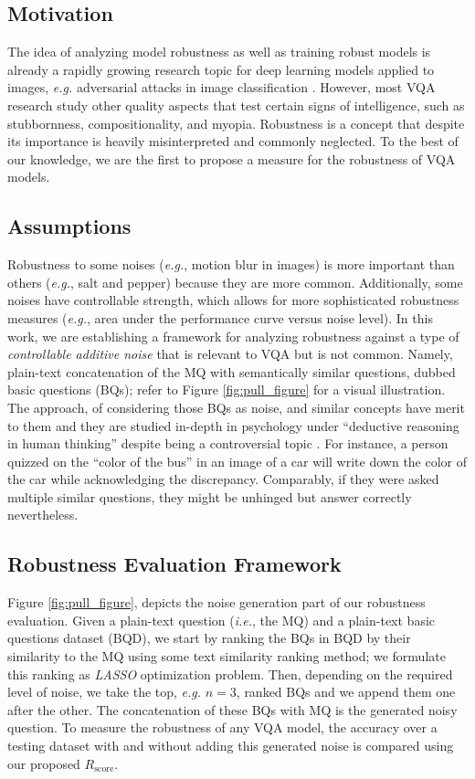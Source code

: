 \documentclass[letterpaper]{article}
\newcommand{\ie}{}\def\ie/{{\em i.e.}}
\newcommand{\eg}{}\def\eg/{{\em e.g.}}
\newcommand{\lasso}{}\def\lasso/{\textit{LASSO}}
\newcommand{\rscore}{}\def\rscore/{$R_{\text{score}}$}
\begin{document}
\subsection{Motivation}
The idea of analyzing model robustness as well as training robust models is already a rapidly growing research topic for deep learning models applied to images, \eg/ adversarial attacks in image classification \cite{61,63}. However, most VQA research study other quality aspects that test certain signs of intelligence, such as stubbornness, compositionality, and myopia. Robustness is a concept that despite its importance is heavily misinterpreted and commonly neglected. To the best of our knowledge, we are the first to propose a measure for the robustness of VQA models.

\subsection{Assumptions}
Robustness to some noises (\eg/, motion blur in images) is more important than others (\eg/, salt and pepper) because they are more common. Additionally, some noises have controllable strength, which allows for more sophisticated robustness measures (\eg/, area under the performance curve versus noise level). In this work, we are establishing a framework for analyzing robustness against a type of \emph{controllable additive noise} that is relevant to VQA but is not common. Namely, plain-text concatenation of the MQ with semantically similar questions, dubbed basic questions (BQs); refer to Figure \ref{fig:pull_figure} for a visual illustration. The approach, of considering those BQs as noise, and similar concepts have merit to them and they are studied in-depth in psychology under ``deductive reasoning in human thinking'' despite being a controversial topic \cite{74}. For instance, a person quizzed on the ``color of the bus'' in an image of a car will write down the color of the car while acknowledging the discrepancy. Comparably, if they were asked multiple similar questions, they might be unhinged but answer correctly nevertheless.

\subsection{Robustness Evaluation Framework}
Figure \ref{fig:pull_figure}, depicts the noise generation part of our robustness evaluation. Given a plain-text question (\ie/, the MQ) and a plain-text basic questions dataset (BQD), we start by ranking the BQs in BQD by their similarity to the MQ using some text similarity ranking method; we formulate this ranking as \lasso/ optimization problem. Then, depending on the required level of noise, we take the top, \eg/ $n=3$, ranked BQs and we append them one after the other. The concatenation of these BQs with MQ is the generated noisy question. To measure the robustness of any VQA model, the accuracy over a testing dataset with and without adding this generated noise is compared using our proposed \rscore/.
\end{document}

